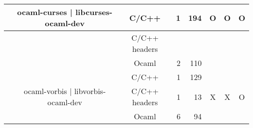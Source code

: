 \documentclass[11pt,a4paper]{article}
\begin{document}
\begin{table}[h,t]
\begin{tabular}{|>{\centering}m{3cm}| c|c|r|r| c| c|c|}
 &\multirow{3}{3cm}{ocaml-curses | libcurses-ocaml-dev} & C/C++ & 1 & 194  & \multirow{2}{*}{O} & \multirow{2}{*}{O} &

 \multirow{2}{*}{O}\\
 \cline{3-5}
 & &                           C/C++ headers &  &  & & & \\

 \cline{3-5}   
 &                                  & Ocaml & 2 & 110  & & & \\       
 \cline{2-8}


 &\multirow{3}{3cm}{ocaml-vorbis | libvorbis-ocaml-dev} & C/C++ & 1 & 129 & \multirow{3}{*}{X} & \multirow{3}{*}{X} & \multirow{3}{*}{O}\\
\cline{3-5}
& &                           C/C++ headers & 1 & 13 & & & \\
\cline{3-5}
& &                          Ocaml & 6 & 94 & & & \\
\hline

\end{tabular}
\end{table}



\end{document}
